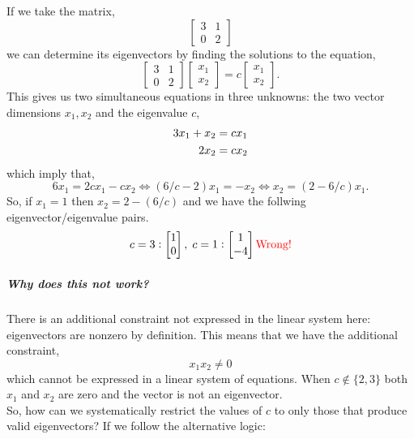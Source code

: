 \documentclass[../MathsNotesBase.tex]{subfiles}
\begin{document}
{ 	
	 	\biggerskip
	 	\begin{exe}
	 		\item{If we take the matrix,
	 			\[ 
		 			\begin{bmatrix}
		 			3 & 1\\
		 			0 & 2
		 			\end{bmatrix}
	 			\]
	 			we can determine its eigenvectors by finding the solutions to the equation,
	 			\[
	 			 	\begin{bmatrix}3 & 1\\0 & 2\end{bmatrix}\begin{bmatrix}x_1\\x_2\end{bmatrix} = c\begin{bmatrix}x_1\\x_2\end{bmatrix}.	 			 	
	 			\]
	 			This gives us two simultaneous equations in three unknowns: the two vector dimensions ${ x_1,x_2 }$ and the eigenvalue $c$,
	 			\begin{align*}
	 			&& 3x_1 + x_2 &= cx_1 \\
	 			&& 2x_2 &= cx_2 &\text{\scriptsize{}} \\
	 			\end{align*}
	 			which imply that,
	 			\[ 6x_1 = 2cx_1 - cx_2 \iff (6/c - 2)x_1 = -x_2 \iff x_2 = (2 - 6/c)x_1. \]
	 			So, if ${ x_1 = 1 }$ then ${ x_2 = 2 - (6/c) }$ and we have the follwing eigenvector/eigenvalue pairs.
	 			\[
	 				c=3: \begin{bmatrix}1\\0\end{bmatrix}, \; c=1: \begin{bmatrix}1\\-4\end{bmatrix} \wrong
	 			\]
	 			\subparagraph{Why does this not work?} There is an additional constraint not expressed in the linear system here: eigenvectors are nonzero by definition. This means that we have the additional constraint,
	 			\[ x_1x_2 \neq 0 \]
	 			which cannot be expressed in a linear system of equations. When ${ c \not\in \{2,3\} }$ both $x_1$ and $x_2$ are zero and the vector is not an eigenvector.\\
	 			So, how can we systematically restrict the values of $c$ to only those that produce valid eigenvectors? If we follow the alternative logic:
	 			\begin{align*}

\end{align*}}
\end{exe}}
\end{document}
